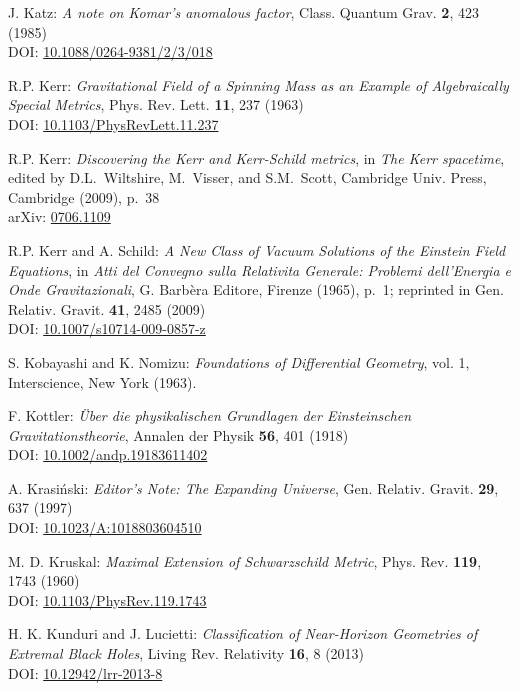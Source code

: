 \begin{thebibliography}{123}
J. Katz:
{\em A note on Komar's anomalous factor},
Class. Quantum Grav. {\bf 2}, 423 (1985)\\
DOI: \href{https://doi.org/10.1088/0264-9381/2/3/018}{10.1088/0264-9381/2/3/018}

R.P. Kerr:
{\em Gravitational Field of a Spinning Mass as an Example of Algebraically Special Metrics},
Phys. Rev. Lett. {\bf 11}, 237 (1963)\\
DOI: \href{https://doi.org/10.1103/PhysRevLett.11.237}{10.1103/PhysRevLett.11.237}

R.P. Kerr: {\em Discovering the Kerr and Kerr-Schild metrics},
in {\em The Kerr spacetime}, edited by D.L.~Wiltshire, M.~Visser, and S.M.~Scott,
Cambridge Univ. Press, Cambridge (2009), p.~38\\
arXiv: \href{https://arxiv.org/abs/0706.1109}{0706.1109}

R.P. Kerr and A. Schild:
{\em A New Class of Vacuum Solutions of the Einstein Field Equations},
in {\em Atti del Convegno sulla Relativita Generale: Problemi
dell’Energia e Onde Gravitazionali}, G. Barbèra Editore,
Firenze (1965), p.~1; reprinted in
Gen. Relativ. Gravit. {\bf 41}, 2485 (2009)\\
DOI: \href{https://doi.org/10.1007/s10714-009-0857-z}{10.1007/s10714-009-0857-z}

S. Kobayashi and K. Nomizu:
{\em Foundations of Differential Geometry}, vol. 1,
Interscience, New York (1963).

F.  Kottler:
{\em \"Uber die physikalischen Grundlagen der Einsteinschen Gravitationstheorie},
Annalen der Physik {\bf 56}, 401 (1918)\\
DOI: \href{https://doi.org/10.1002/andp.19183611402}{10.1002/andp.19183611402}

A. Krasi\'nski:
{\em Editor's Note: The Expanding Universe},
Gen. Relativ. Gravit. {\bf 29}, 637 (1997)\\
DOI: \href{https://doi.org/10.1023/A:1018803604510}{10.1023/A:1018803604510}

M. D. Kruskal:
{\em Maximal Extension of Schwarzschild Metric},
Phys. Rev. {\bf 119}, 1743 (1960)\\
DOI: \href{https://doi.org/10.1103/PhysRev.119.1743}{10.1103/PhysRev.119.1743}

H. K. Kunduri and J. Lucietti:
{\em Classification of Near-Horizon Geometries of Extremal Black Holes},
Living Rev. Relativity {\bf 16}, 8 (2013)\\
DOI: \href{https://doi.org/10.12942/lrr-2013-8}{10.12942/lrr-2013-8}


\end{thebibliography}
